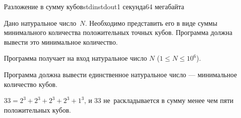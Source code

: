 \begin{problem}{Разложение в сумму кубов}{stdin}{stdout}{1 секунда}{64 мегабайта}

Дано натуральное число~$N$. Необходимо представить его в виде суммы минимального количества положительных точных кубов. Программа должна вывести это минимальное количество.


\InputFile
Программа получает на вход натуральное число $N$ ($1\leqslant N\leqslant 10^6$).

\OutputFile
Программа должна вывести единственное натуральное число --- минимальное количество кубов.

\Examples

\begin{example}
%
\end{example}

\Note
$33=2^3+2^3+2^3+2^3+1^3$, и 33 не~раскладывается в сумму менее чем пяти положительных кубов.

\end{problem}
